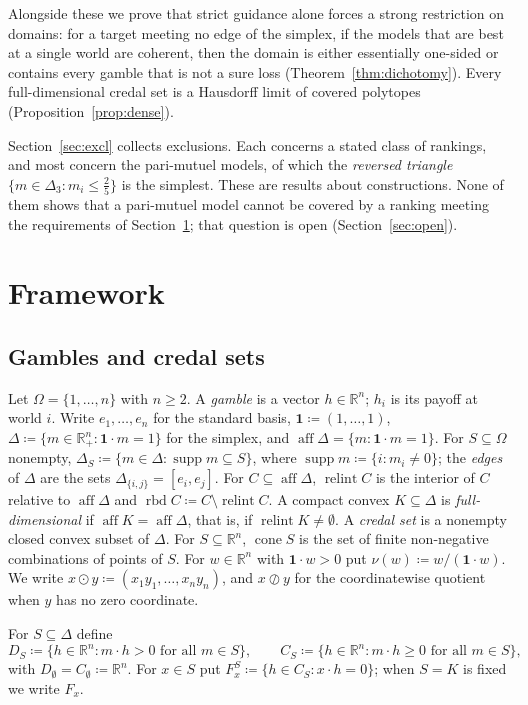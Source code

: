\documentclass[11pt]{article}
\newcommand{\R}{\mathbb{R}}
\newcommand{\one}{\mathbf{1}}
\DeclareMathOperator{\cone}{cone}
\DeclareMathOperator{\relint}{relint}
\DeclareMathOperator{\rbd}{rbd}
\DeclareMathOperator{\aff}{aff}
\DeclareMathOperator{\supp}{supp}
\theoremstyle{plain}
\theoremstyle{definition}
\theoremstyle{remark}
\begin{document}
Alongside these we prove that strict guidance alone forces a strong restriction on
domains: for a target meeting no edge of the simplex, if the models that are best at a
single world are coherent, then the domain is either essentially one-sided or contains
every gamble that is not a sure loss (Theorem~\ref{thm:dichotomy}). Every
full-dimensional credal set is a Hausdorff limit of covered polytopes
(Proposition~\ref{prop:dense}).

Section~\ref{sec:excl} collects exclusions. Each concerns a stated class of rankings, and
most concern the pari-mutuel models, of which the \emph{reversed triangle}
$\{m\in\Delta_3:m_i\le\frac25\}$ is the simplest. These are results about constructions.
None of them shows that a pari-mutuel model cannot be covered by a ranking meeting the
requirements of Section~\ref{sec:framework}; that question is open
(Section~\ref{sec:open}).

\section{Framework}\label{sec:framework}

\subsection{Gambles and credal sets}

Let $\Omega=\{1,\dots,n\}$ with $n\ge2$. A \emph{gamble} is a vector $h\in\R^n$; $h_i$ is
its payoff at world $i$. Write $e_1,\dots,e_n$ for the standard basis, $\one\coloneqq
(1,\dots,1)$, $\Delta\coloneqq\{m\in\R^n_+:\one\cdot m=1\}$ for the simplex, and
$\aff\Delta=\{m:\one\cdot m=1\}$. For $S\subseteq\Omega$ nonempty, $\Delta_S\coloneqq\{m\in
\Delta:\supp m\subseteq S\}$, where $\supp m\coloneqq\{i:m_i\neq0\}$; the \emph{edges} of
$\Delta$ are the sets $\Delta_{\{i,j\}}=[e_i,e_j]$. For $C\subseteq\aff\Delta$, $\relint C$
is the interior of $C$ relative to $\aff\Delta$ and $\rbd C\coloneqq C\setminus\relint C$.
A compact convex $K\subseteq\Delta$ is \emph{full-dimensional} if $\aff K=\aff\Delta$, that
is, if $\relint K\neq\emptyset$. A \emph{credal set} is a nonempty closed convex subset of
$\Delta$. For $S\subseteq\R^n$, $\cone S$ is the set of finite non-negative combinations of
points of $S$. For $w\in\R^n$ with $\one\cdot w>0$ put $\nu(w)\coloneqq w/(\one\cdot w)$.
We write $x\odot y\coloneqq(x_1y_1,\dots,x_ny_n)$, and $x\oslash y$ for the coordinatewise
quotient when $y$ has no zero coordinate.

For $S\subseteq\Delta$ define
\[
  D_S\coloneqq\{h\in\R^n: m\cdot h>0\text{ for all }m\in S\},\qquad
  C_S\coloneqq\{h\in\R^n: m\cdot h\ge0\text{ for all }m\in S\},
\]
with $D_\emptyset=C_\emptyset\coloneqq\R^n$. For $x\in S$ put $F^S_x\coloneqq\{h\in
C_S:x\cdot h=0\}$; when $S=K$ is fixed we write $F_x$.
\end{document}

